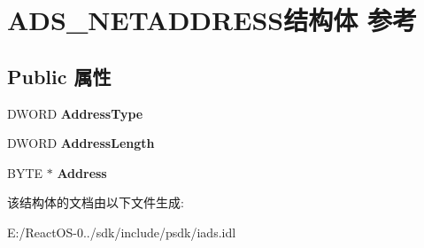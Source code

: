 \hypertarget{struct_a_d_s___n_e_t_a_d_d_r_e_s_s}{}\section{A\+D\+S\+\_\+\+N\+E\+T\+A\+D\+D\+R\+E\+S\+S结构体 参考}
\label{struct_a_d_s___n_e_t_a_d_d_r_e_s_s}
\subsection*{Public 属性}
\begin{DoxyCompactItemize}
\item 
\mbox{\label{struct_a_d_s___n_e_t_a_d_d_r_e_s_s_a03e0a731e7f42b5f3098ba7070a855a9}} 
D\+W\+O\+RD {\bfseries Address\+Type}
\item 
\mbox{\label{struct_a_d_s___n_e_t_a_d_d_r_e_s_s_ac8e90dcf83113703f0ceba56509c099e}} 
D\+W\+O\+RD {\bfseries Address\+Length}
\item 
\mbox{\label{struct_a_d_s___n_e_t_a_d_d_r_e_s_s_ae66a6309d4e55146aa503eb6f4e427e9}} 
B\+Y\+TE $\ast$ {\bfseries Address}
\end{DoxyCompactItemize}


该结构体的文档由以下文件生成\+:\begin{DoxyCompactItemize}
\item 
E\+:/\+React\+O\+S-\/0../sdk/include/psdk/iads.\+idl\end{DoxyCompactItemize}
